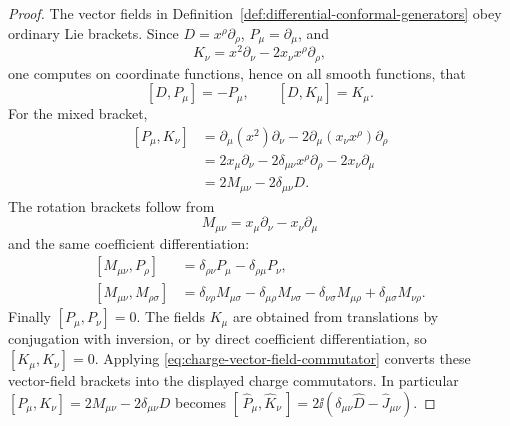 \begin{proof}
The vector fields in
Definition~\ref{def:differential-conformal-generators} obey ordinary Lie
brackets.  Since \(D=x^\rho\partial_\rho\), \(P_\mu=\partial_\mu\), and
\[
  K_\nu=x^2\partial_\nu-2x_\nu x^\rho\partial_\rho ,
\]
one computes on coordinate functions, hence on all smooth functions, that
\[
  [D,P_\mu]=-P_\mu,\qquad [D,K_\mu]=K_\mu .
\]
For the mixed bracket,
\[
\begin{aligned}
  [P_\mu,K_\nu]
  &=
  \partial_\mu(x^2)\partial_\nu
  -2\partial_\mu(x_\nu x^\rho)\partial_\rho  \\
  &=
  2x_\mu\partial_\nu
  -2\delta_{\mu\nu}x^\rho\partial_\rho
  -2x_\nu\partial_\mu                         \\
  &=
  2M_{\mu\nu}-2\delta_{\mu\nu}D .
\end{aligned}
\]
The rotation brackets follow from
\[
  M_{\mu\nu}=x_\mu\partial_\nu-x_\nu\partial_\mu
\]
and the same coefficient differentiation:
\[
\begin{aligned}
  [M_{\mu\nu},P_\rho]
  &=
  \delta_{\rho\nu}P_\mu-\delta_{\rho\mu}P_\nu,\\
  [M_{\mu\nu},M_{\rho\sigma}]
  &=
  \delta_{\nu\rho}M_{\mu\sigma}
  -\delta_{\mu\rho}M_{\nu\sigma}
  -\delta_{\nu\sigma}M_{\mu\rho}
  +\delta_{\mu\sigma}M_{\nu\rho}.
\end{aligned}
\]
Finally \([P_\mu,P_\nu]=0\).  The fields \(K_\mu\) are obtained from
translations by conjugation with inversion, or by direct coefficient
differentiation, so \([K_\mu,K_\nu]=0\).  Applying
\eqref{eq:charge-vector-field-commutator} converts these vector-field brackets
into the displayed charge commutators.  In
particular \([P_\mu,K_\nu]=2M_{\mu\nu}-2\delta_{\mu\nu}D\) becomes
\([\,\widehat P_\mu,\widehat K_\nu\,]
=2\ii(\delta_{\mu\nu}\widehat D-\widehat J_{\mu\nu})\).
\end{proof}

